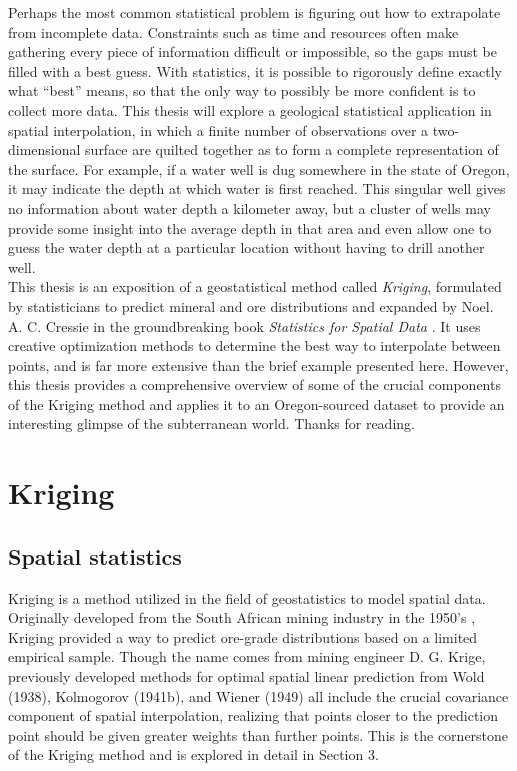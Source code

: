 \documentclass[12pt,twoside]{reedthesis}
\begin{document}
Perhaps the most common statistical problem is figuring out how to extrapolate from incomplete data. Constraints such as time and resources often make gathering every piece of information difficult or impossible, so the gaps must be filled with a best guess. With statistics, it is possible to rigorously define exactly what ``best'' means, so that the only way to possibly be more confident is to collect more data. This thesis will explore a geological statistical application in spatial interpolation, in which a finite number of observations over a two-dimensional surface are quilted together as to form a complete representation of the surface. For example, if a water well is dug somewhere in the state of Oregon, it may indicate the depth at which water is first reached. This singular well gives no information about water depth a kilometer away, but a cluster of wells may provide some insight into the average depth in that area and even allow one to guess the water depth at a particular location without having to drill another well. \\

This thesis is an exposition of a geostatistical method called \emph{Kriging}, formulated by statisticians to predict mineral and ore distributions and expanded by Noel. A. C. Cressie in the groundbreaking book \emph{Statistics for Spatial Data} \cite{cressie:1993}. It uses creative optimization methods to determine the best way to interpolate between points, and is far more extensive than the brief example presented here. However, this thesis provides a comprehensive overview of some of the crucial components of the Kriging method and applies it to an Oregon-sourced dataset to provide an interesting glimpse of the subterranean world. Thanks for reading.
	
	

	
	
	
    \chapter{Kriging}
    	\section{Spatial statistics}
Kriging is a method utilized in the field of geostatistics to model spatial data. Originally developed from the South African mining industry in the 1950's \cite{cressie:1993}, Kriging provided a way to predict ore-grade distributions based on a limited empirical sample. Though the name comes from mining engineer D. G. Krige, previously developed methods for optimal spatial linear prediction from Wold (1938), Kolmogorov (1941b), and Wiener (1949) all include the crucial covariance component of spatial interpolation, realizing that points closer to the prediction point should be given greater weights than further points. This is the cornerstone of the Kriging method and is explored in detail in Section 3. \\
\end{document}
